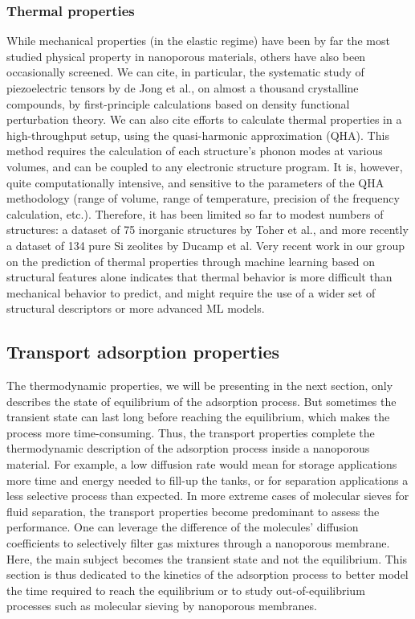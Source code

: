 \documentclass[main.tex]{subfiles}
\begin{document}
\subsubsection{Thermal properties}

While mechanical properties (in the elastic regime) have been by far the most studied physical property in nanoporous materials, others have also been occasionally screened. We can cite, in particular, the systematic study of piezoelectric tensors by de Jong et al., on almost a thousand crystalline compounds, by first-principle calculations based on density functional perturbation theory.\autocite{deJong2015_piezo} We can also cite efforts to calculate thermal properties in a high-throughput setup, using the quasi-harmonic approximation (QHA).\autocite{Togo_2010} This method requires the calculation of each structure's phonon modes at various volumes, and can be coupled to any electronic structure program.\autocite{Togo_2015} It is, however, quite computationally intensive, and sensitive to the parameters of the QHA methodology (range of volume, range of temperature, precision of the frequency calculation, etc.). Therefore, it has been limited so far to modest numbers of structures: a dataset of 75 inorganic structures by Toher et al.,\autocite{Toher_2014} and more recently a dataset of 134 pure Si zeolites by Ducamp et al.\autocite{Ducamp_2021} Very recent work in our group on the prediction of thermal properties through machine learning based on structural features alone indicates that thermal behavior is more difficult than mechanical behavior to predict, and might require the use of a wider set of structural descriptors or more advanced ML models.\autocite{Ducamp_2022}


\subsection{Transport adsorption properties}

The thermodynamic properties, we will be presenting in the next section, only describes the state of equilibrium of the adsorption process. But sometimes the transient state can last long before reaching the equilibrium, which makes the process more time-consuming. Thus, the transport properties complete the thermodynamic description of the adsorption process inside a nanoporous material. For example, a low diffusion rate would mean for storage applications more time and energy needed to fill-up the tanks, or for separation applications a less selective process than expected. In more extreme cases of molecular sieves for fluid separation, the transport properties become predominant to assess the performance. One can leverage the difference of the molecules' diffusion coefficients to selectively filter gas mixtures through a nanoporous membrane.\autocite{Miandoab_2021} Here, the main subject becomes the transient state and not the equilibrium. This section is thus dedicated to the kinetics of the adsorption process to better model the time required to reach the equilibrium or to study out-of-equilibrium processes such as molecular sieving by nanoporous membranes.
\end{document}

